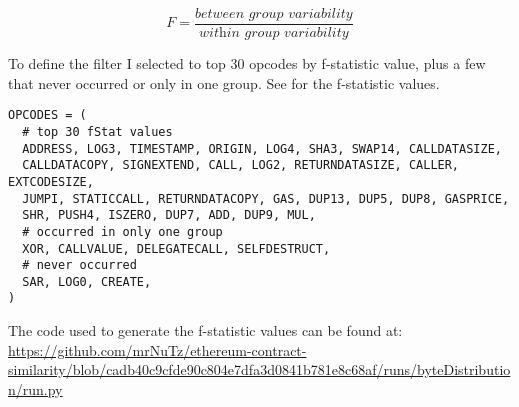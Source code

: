 \documentclass[../main.tex]{subfiles}
\begin{document}
\begin{equation}
  F = \dfrac{\textit{between group variability}}{\textit{within group variability}}
  \label{eq:ftest}
\end{equation}

To define the  filter I selected to top 30 opcodes by f-statistic value, plus a few that never occurred or only in one group. See  for the f-statistic values.

\begin{lstlisting}[style=pymd]
OPCODES = (
  # top 30 fStat values
  ADDRESS, LOG3, TIMESTAMP, ORIGIN, LOG4, SHA3, SWAP14, CALLDATASIZE,
  CALLDATACOPY, SIGNEXTEND, CALL, LOG2, RETURNDATASIZE, CALLER, EXTCODESIZE,
  JUMPI, STATICCALL, RETURNDATACOPY, GAS, DUP13, DUP5, DUP8, GASPRICE,
  SHR, PUSH4, ISZERO, DUP7, ADD, DUP9, MUL,
  # occurred in only one group
  XOR, CALLVALUE, DELEGATECALL, SELFDESTRUCT,
  # never occurred
  SAR, LOG0, CREATE,
)
\end{lstlisting}

The code used to generate the f-statistic values can be found at: \url{https://github.com/mrNuTz/ethereum-contract-similarity/blob/cadb40c9cfde90c804e7dfa3d0841b781e8c68af/runs/byteDistribution/run.py}
\end{document}
